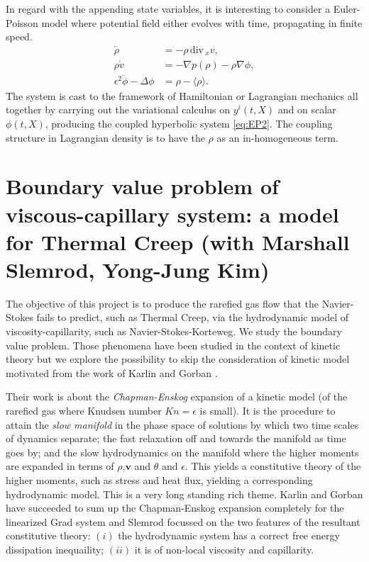 \documentclass[a4paper,11pt]{article}
\def\div{\,\textrm{div}\,}
\begin{document}
In regard with the appending state variables, it is interesting to consider a Euler-Poisson model where potential field either evolves with time, propagating in finite speed.%
\begin{equation} \label{eq:EP2}
\begin{aligned}
 \dot{\rho} &= -\rho \div_x v,\\
 \rho\dot{v}&= -\nabla p(\rho) - \rho\nabla\phi,\\
 \epsilon^2\ddot\phi-\Delta \phi&= \rho-\langle\rho\rangle.
\end{aligned}
\end{equation}
The system is cast to the framework of Hamiltonian or Lagrangian mechanics all together by carrying out the variational calculus on $y^i(t,X)$ and on scalar $\phi(t,X)$, producing the coupled hyperbolic system \eqref{eq:EP2}. The coupling structure in Lagrangian density is to have the $\rho$ as an in-homogeneous term. %

\section{Boundary value problem of viscous-capillary system: a model for Thermal Creep {\small (with Marshall Slemrod, Yong-Jung Kim)}}
The objective of this project is to produce the rarefied gas flow that the Navier-Stokes fails to predict, such as Thermal Creep, via the hydrodynamic model of viscosity-capillarity, such as Navier-Stokes-Korteweg. We study the boundary value problem. Those phenomena have been studied in the context of kinetic theory but we explore the possibility to skip the consideration of kinetic model motivated from the work of Karlin and Gorban \cite{GK}.

Their work is about the {\it Chapman-Enskog} expansion of a kinetic model (of the rarefied gas where Knudsen number $Kn=\epsilon$ is small). It is the procedure to attain the {\it slow manifold} in the phase space of solutions by which two time scales of dynamics separate; the fast relaxation off and towards the manifold as time goes by; and the slow hydrodynamics on the manifold where the higher moments are expanded in terms of $\rho$,$\mathbf{v}$ and $\theta$ and $\epsilon$. This yields a constitutive theory of the higher moments, such as stress and heat flux, yielding a corresponding hydrodynamic model. This is a very long standing rich theme. Karlin and Gorban have succeeded to sum up the {Chapman-Enskog} expansion completely for the linearized Grad system and 
Slemrod focussed on the two features of the resultant constitutive theory: $(i)$ the hydrodynamic system has a correct free energy dissipation inequaility; $(ii)$ it is of non-local viscosity and capillarity.  
\end{document}
